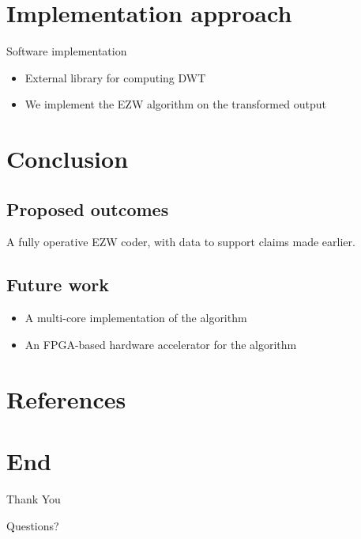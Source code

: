 \documentclass{beamer}
\begin{document}
\section{Implementation approach}
\begin{frame}{Software implementation}
    \begin{itemize}
        \item External library for computing DWT \cite{wavelib}
        \item We implement the EZW algorithm on the transformed output
    \end{itemize}
\end{frame}

\section{Conclusion}
\subsection{Proposed outcomes}
\begin{frame}
    A fully operative EZW coder, with data to support claims made earlier.
\end{frame}

\subsection{Future work}
\begin{frame}
    \begin{itemize}
        \item A multi-core implementation of the algorithm
        \item An FPGA-based hardware accelerator for the algorithm
    \end{itemize}
\end{frame}

\section{References}
\begin{frame}
    \printbibliography
\end{frame}

\section{End}
\begin{frame}
    \centering
    \huge{Thank You}
    \par
    \huge{Questions?}
\end{frame}
\end{document}
